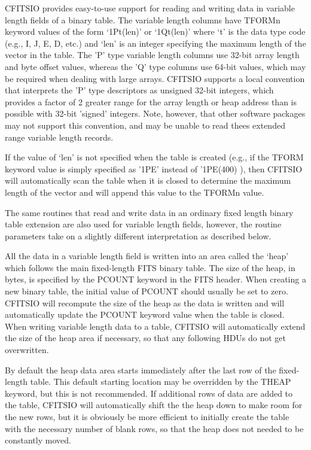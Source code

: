 \documentclass[11pt]{book}
\begin{document}
CFITSIO provides easy-to-use support for reading and writing data in
variable length fields of a binary table. The variable length columns
have TFORMn keyword values of the form `1Pt(len)' or `1Qt(len)' where `t'
is the data type code (e.g., I, J, E, D, etc.) and `len' is an integer
specifying the maximum length of the vector in the table.  The 'P' type
variable length columns use 32-bit array length and byte offset values, whereas
the 'Q' type columns use 64-bit values, which may be required when dealing
with large arrays.  CFITSIO supports a local convention that interprets
the 'P' type descriptors as unsigned 32-bit integers, which provides
a factor of 2 greater range for the array length or heap address than
is possible with 32-bit 'signed' integers.  Note, however, that other software
packages may not support this convention, and may be unable to read thees
extended range variable length records.

If the value
of `len' is not specified when the table is created (e.g., if the TFORM
keyword value is simply specified as '1PE' instead of '1PE(400) ), then
CFITSIO will automatically scan the table when it is closed to
determine the maximum length of the vector and will append this value
to the TFORMn value.

The same routines that read and write data in an ordinary fixed length
binary table extension are also used for variable length fields,
however, the routine parameters take on a slightly different
interpretation as described below.

All the data in a variable length field is written into an area called
the `heap' which follows the main fixed-length FITS binary table. The
size of the heap, in bytes, is specified by the PCOUNT keyword in the
FITS header. When creating a new binary table, the initial value of
PCOUNT should usually be set to zero. CFITSIO will recompute the size
of the heap as the data is written and will automatically update the
PCOUNT keyword value when the table is closed.  When writing variable
length data to a table, CFITSIO will automatically extend the size
of the heap area if necessary, so that any following HDUs do not
get overwritten.

By default the heap data area starts immediately after the last row of
the fixed-length table.  This default starting location may be
overridden by the THEAP keyword, but this is not recommended.
If additional rows of data are added to the table, CFITSIO will
automatically shift the the heap down to make room for the new
rows, but it is obviously be more efficient to initially
create the table with the necessary number of blank rows, so that
the heap does not needed to be constantly moved.
\end{document}

